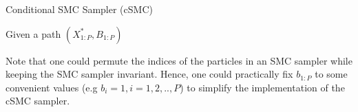 \documentclass[12pt,a4paper]{article}
\begin{document}
\begin{algorithm}[htb!]
    \caption{Conditional SMC Sampler (cSMC)}\label{Alg:CSMC}
    Given a path $\left(X_{1:P}^{*},B_{1:P}\right)$\;
    
\end{algorithm}

Note that one could permute the indices of the particles in an SMC sampler while keeping the SMC sampler invariant. Hence, one could practically fix \(b_{1:P}\) to some convenient values (e.g \(b_i=1, i=1,2,..,P\)) to simplify the implementation of the cSMC sampler. 
\end{document}

